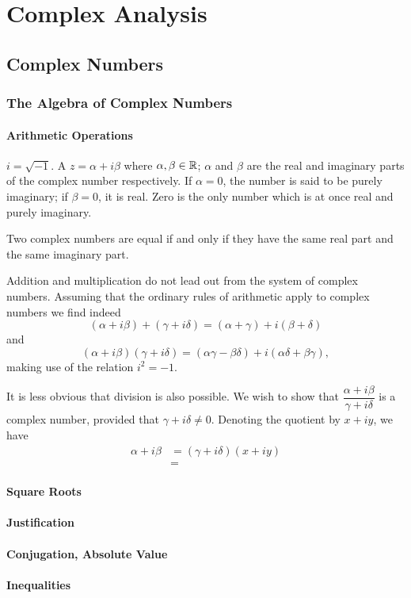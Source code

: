 \part{Complex Analysis}
\chapter{Complex Numbers}
\section{The Algebra of Complex Numbers}
\subsection{Arithmetic Operations}
 $i=\sqrt{-1}$. A  $z=\alpha+i\beta$ where $\alpha,\beta\in\mathbb R$; $\alpha$ and $\beta$ are the real and imaginary parts of the complex number respectively. If $\alpha=0$, the number is said to be purely imaginary; if $\beta=0$, it is real. Zero is the only number which is at once real and purely imaginary.

Two complex numbers are equal if and only if they have the same real part and the same imaginary part.

Addition and multiplication do not lead out from the system of complex numbers. Assuming that the ordinary rules of arithmetic apply to complex numbers we find indeed
\[(\alpha+i\beta)+(\gamma+i\delta)=(\alpha+\gamma)+i(\beta+\delta)\]
and
\[(\alpha+i\beta)(\gamma+i\delta)=(\alpha\gamma-\beta\delta)+i(\alpha\delta+\beta\gamma),\]
making use of the relation $i^2=-1$.

It is less obvious that division is also possible. We wish to show that $\dfrac{\alpha+i\beta}{\gamma+i\delta}$ is a complex number, provided that $\gamma+i\delta\neq0$. Denoting the quotient by $x+iy$, we have
\begin{align*}
\alpha+i\beta&=(\gamma+i\delta)(x+iy)\\
&=
\end{align*}

\subsection{Square Roots}
\subsection{Justification}
\subsection{Conjugation, Absolute Value}
\subsection{Inequalities}